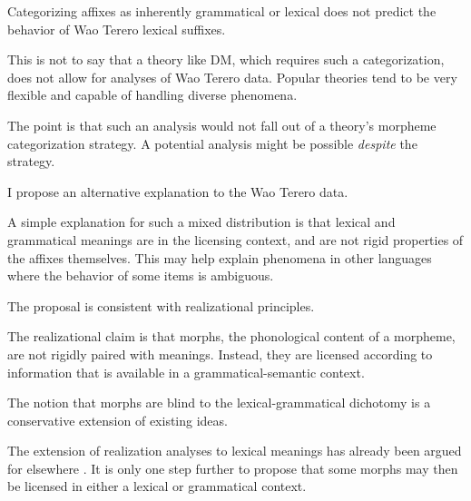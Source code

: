 \documentclass{beamer}
\begin{document}

\begin{frame}{Categorizing affixes as inherently grammatical or lexical does not predict the behavior of Wao Terero lexical suffixes.}

  This is not to say that a theory like DM, which requires such a categorization, does not allow for analyses of Wao Terero data.
  Popular theories tend to be very flexible and capable of handling diverse phenomena.
  
  \vfill
  
  The point is that such an analysis would not fall out of a theory's morpheme categorization strategy.
  A potential analysis might be possible \emph{despite} the strategy.
  
\end{frame}

\begin{frame}{I propose an alternative explanation to the Wao Terero data.}

  A simple explanation for such a mixed distribution is that lexical and grammatical meanings are in the licensing context, and are not rigid properties of the affixes themselves.
  This may help explain phenomena in other languages where the behavior of some items is ambiguous.

\end{frame}

\begin{frame}{The proposal is consistent with realizational principles.}
  
  The realizational claim is that morphs, the phonological content of a morpheme, are not rigidly paired with meanings.
  Instead, they are licensed according to information that is available in a grammatical-semantic context.

\end{frame}

\begin{frame}{The notion that morphs are blind to the lexical-grammatical dichotomy is a conservative extension of existing ideas.}
  
  The extension of realization analyses to lexical meanings has already been argued for elsewhere \citep{Harley2014}.
  It is only one step further to propose that some morphs may then be licensed in either a lexical or grammatical context.
  
\end{frame}
\end{document}
